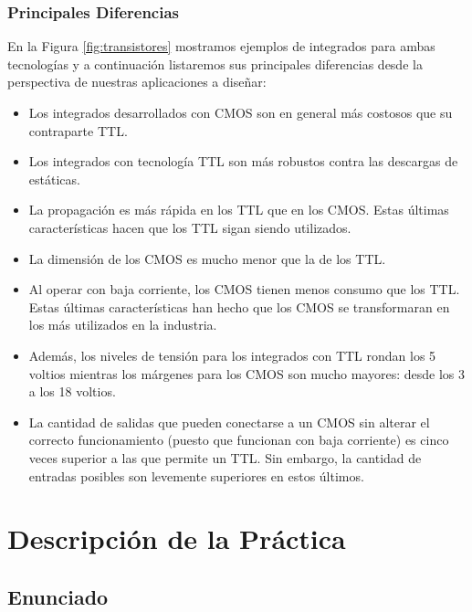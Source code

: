 \documentclass[a4paper]{article}
\begin{document}
\subsubsection*{Principales Diferencias}

En la Figura \ref{fig:transistores} mostramos ejemplos de integrados 
para ambas tecnologías y a continuación listaremos sus principales 
diferencias desde la perspectiva de nuestras aplicaciones a diseñar:

\begin{itemize}
    \item {
        Los integrados desarrollados con CMOS son en general más 
        costosos que su contraparte TTL.
    }
    \item {
        Los integrados con tecnología TTL son más robustos contra
        las descargas de estáticas.
    }
    \item {
        La propagación es más rápida en los TTL que en los CMOS. 
        Estas últimas características hacen que los TTL sigan siendo
        utilizados.
    }    
    \item {
        La dimensión de los CMOS es mucho menor que la de los TTL.
    }
    \item {
        Al operar con baja corriente, los CMOS tienen menos consumo 
        que los TTL. Estas últimas características han hecho que los 
        CMOS se transformaran en los más utilizados en la industria.
    }
    \item {
        Además, los niveles de tensión para los integrados con TTL 
        rondan los 5 voltios mientras los márgenes para los CMOS son
        mucho mayores: desde los 3 a los 18 voltios.
    }
    \item {
        La cantidad de salidas que pueden conectarse a un CMOS sin 
        alterar el correcto funcionamiento (puesto que funcionan con
        baja corriente) es cinco veces superior a las que permite un 
        TTL. Sin embargo, la cantidad de entradas posibles son 
        levemente superiores en estos últimos.
    }

\end{itemize}


\section{Descripción de la Práctica}

\subsection{Enunciado}
\end{document}
